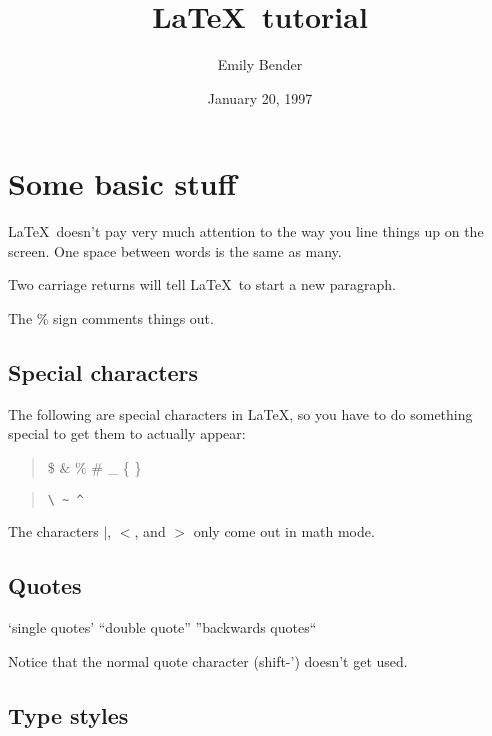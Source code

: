 \newcommand{\es}{\enumsentence}
\newcommand{\ees}{\eenumsentence}

\title{\LaTeX\ tutorial}
\author{Emily Bender}
\date{January 20, 1997}


\maketitle

\section{Some basic stuff}

\LaTeX\ doesn't pay very much attention to the way you line things
up on the screen.  One space between words is the same as       many.

Two carriage returns will tell \LaTeX\ to start a new paragraph.

The \% sign comments things out.  %

\subsection{Special characters}

The following are special characters in \LaTeX, so you have to
do something special to get them to actually appear:

\begin{quote}
\$ \& \% \# \_ \{ \}
\end{quote}

\begin{quote}
\begin{verbatim}
\ ~ ^
\end{verbatim}
\end{quote}

The characters $|$, $<$, and $>$ only come out in math mode.

\subsection{Quotes}

`single quotes'
``double quote''
''backwards quotes``

Notice that the normal quote character (shift-') doesn't
get used.

\subsection{Type styles}

